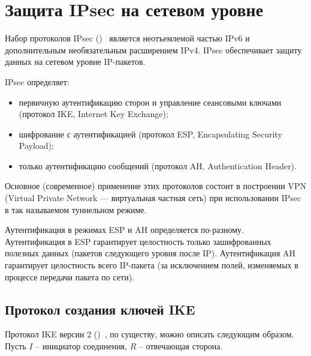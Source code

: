 \section{Защита IPsec на сетевом уровне}

Набор протоколов IPsec ()~\cite{rfc4301} является неотъемлемой частью IPv6 и дополнительным необязательным расширением IPv4. IPsec обеспечивает защиту данных на сетевом уровне IP-пакетов.

IPsec определяет:
\begin{itemize}
    \item первичную аутентификацию сторон и управление сеансовыми ключами (протокол IKE, Internet Key Exchange);
    \item шифрование с аутентификацией (протокол ESP, Encapsulating Security Payload);
    \item только аутентификацию сообщений (протокол AH, Authentication Header).
\end{itemize}
Основное (современное) применение этих протоколов состоит в построении VPN (Virtual Private Network --- виртуальная частная сеть) при использовании IPsec в так называемом туннельном режиме.

Аутентификация в режимах ESP и AH определяется по-разному. Аутентификация в ESP гарантирует целостность только зашифрованных полезных данных (пакетов следующего уровня после IP). Аутентификация AH гарантирует целостность всего IP-пакета (за исключением полей, изменяемых в процессе передачи пакета по сети).

\subsection{Протокол создания ключей IKE}


Протокол IKE версии 2 ()~\cite{rfc4306}, по существу, можно описать следующим образом. Пусть $I$ -- инициатор соединения, $R$ -- отвечающая сторона.

